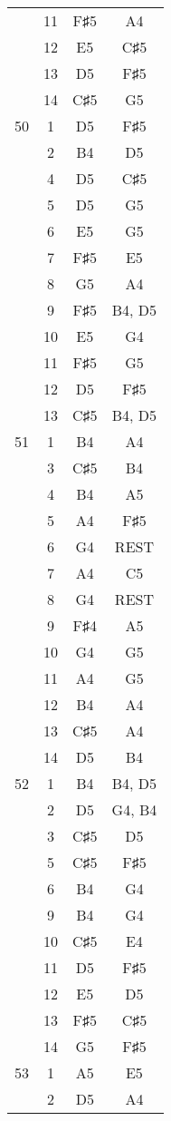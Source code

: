 \documentclass{article}
\begin{document}
\begin{longtable}{|c|c|c|c|}
  & 11 & F♯5 & A4 \\ 
  & 12 & E5 & C♯5 \\ 
  & 13 & D5 & F♯5 \\ 
  & 14 & C♯5 & G5 \\ 
\hline
50 & 1 & D5 & F♯5 \\ 
  & 2 & B4 & D5 \\ 
  & 4 & D5 & C♯5 \\ 
  & 5 & D5 & G5 \\ 
  & 6 & E5 & G5 \\ 
  & 7 & F♯5 & E5 \\ 
  & 8 & G5 & A4 \\ 
  & 9 & F♯5 & B4, D5 \\ 
  & 10 & E5 & G4 \\ 
  & 11 & F♯5 & G5 \\ 
  & 12 & D5 & F♯5 \\ 
  & 13 & C♯5 & B4, D5 \\ 
\hline
51 & 1 & B4 & A4 \\ 
  & 3 & C♯5 & B4 \\ 
  & 4 & B4 & A5 \\ 
  & 5 & A4 & F♯5 \\ 
  & 6 & G4 & REST \\ 
  & 7 & A4 & C5 \\ 
  & 8 & G4 & REST \\ 
  & 9 & F♯4 & A5 \\ 
  & 10 & G4 & G5 \\ 
  & 11 & A4 & G5 \\ 
  & 12 & B4 & A4 \\ 
  & 13 & C♯5 & A4 \\ 
  & 14 & D5 & B4 \\ 
\hline
52 & 1 & B4 & B4, D5 \\ 
  & 2 & D5 & G4, B4 \\ 
  & 3 & C♯5 & D5 \\ 
  & 5 & C♯5 & F♯5 \\ 
  & 6 & B4 & G4 \\ 
  & 9 & B4 & G4 \\ 
  & 10 & C♯5 & E4 \\ 
  & 11 & D5 & F♯5 \\ 
  & 12 & E5 & D5 \\ 
  & 13 & F♯5 & C♯5 \\ 
  & 14 & G5 & F♯5 \\ 
\hline
53 & 1 & A5 & E5 \\ 
  & 2 & D5 & A4 \\ 

\end{longtable}
\end{document}

